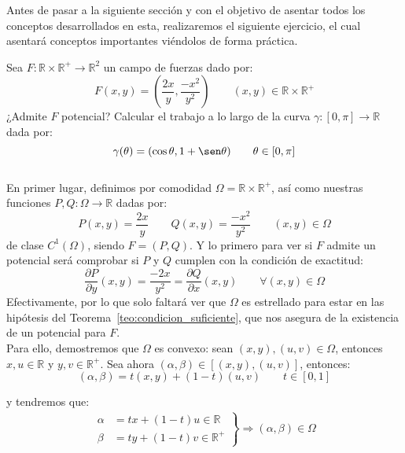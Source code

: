 Antes de pasar a la siguiente sección y con el objetivo de asentar todos los conceptos desarrollados en esta, realizaremos el siguiente ejercicio, el cual asentará conceptos importantes viéndolos de forma práctica.

\begin{ejercicio*}
    Sea $F:\mathbb{R}\times\mathbb{R}^+\rightarrow\mathbb{R}^2$ un campo de fuerzas dado por:
    \begin{equation*}
        F(x,y) = \left(\dfrac{2x}{y}, \dfrac{-x^2}{y^2}\right) \qquad (x,y)\in \mathbb{R}\times\mathbb{R}^+
    \end{equation*}
    ¿Admite $F$ potencial? Calcular el trabajo a lo largo de la curva $\gamma:[0,\pi]\rightarrow\mathbb{R}$ dada por:
    \begin{equation*}
        \gamma(\theta) = (\cos\theta, 1+\sen\theta) \qquad \theta\in [0,\pi]
    \end{equation*}~\\

    En primer lugar, definimos por comodidad $\Omega=\mathbb{R}\times\mathbb{R}^+$, así como nuestras funciones $P,Q:\Omega\rightarrow\mathbb{R}$ dadas por:
    \begin{equation*}
        P(x,y) = \dfrac{2x}{y} \qquad Q(x,y) = \dfrac{-x^2}{y^2} \qquad (x,y)\in \Omega
    \end{equation*}
    de clase $C^1(\Omega)$, siendo $F=(P,Q)$. Y lo primero para ver si $F$ admite un potencial será comprobar si $P$ y $Q$ cumplen con la condición de exactitud:
    \begin{equation*}
        \dfrac{\partial P}{\partial y}(x,y) = \dfrac{-2x}{y^2} = \dfrac{\partial Q}{\partial x}(x,y) \qquad \forall (x,y)\in \Omega
    \end{equation*}
    Efectivamente, por lo que solo faltará ver que $\Omega$ es estrellado para estar en las hipótesis del Teorema~\ref{teo:condicion_suficiente}, que nos asegura de la existencia de un potencial para $F$.\\

    Para ello, demostremos que $\Omega$ es convexo: sean $(x,y),(u,v)\in \Omega$, entonces ${x,u\in \mathbb{R}}$ y $y,v\in \mathbb{R}^+$. Sea ahora $(\alpha,\beta)\in [(x,y),(u,v)]$, entonces:
    \begin{equation*}
        (\alpha,\beta) = t(x,y) + (1-t)(u,v) \qquad t\in [0,1]
    \end{equation*}

    y tendremos que:
    \begin{align*}
        \left.\begin{array}{rl}
            \alpha &= tx + (1-t)u \in \mathbb{R} \\
            \beta &= ty + (1-t)v \in \mathbb{R}^+
        \end{array}\right\} \Longrightarrow (\alpha,\beta)\in \Omega
    \end{align*}


\end{ejercicio*}

